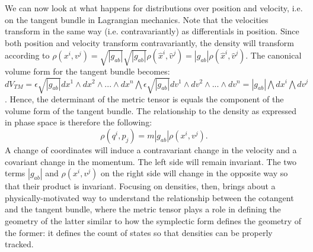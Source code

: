 \documentclass[letterpaper]{article}
\begin{document}

We can now look at what happens for distributions over position and velocity, i.e. on the tangent bundle in Lagrangian mechanics. Note that the velocities transform in the same way (i.e. contravariantly) as differentials in position. Since both position and velocity transform contravariantly, the density will transform according to $\rho(x^i, v^j) = \sqrt{|g_{ab}|} \sqrt{|g_{ab}|} \rho(\hat{x}^i, \hat{v}^j) = |g_{ab}| \rho(\hat{x}^i, \hat{v}^j)$. The canonical volume form for the tangent bundle becomes: $dV_{TM} = \epsilon \sqrt{|g_{ab}|} dx^1 \wedge dx^2 \wedge ... \wedge dx^n \bigwedge \epsilon \sqrt{|g_{ab}|} dv^1 \wedge dv^2 \wedge ... \wedge dv^n = |g_{ab}| \bigwedge dx^i \bigwedge dv^j$. Hence, the determinant of the metric tensor is equals the component of the volume form of the tangent bundle. The relationship to the density as expressed in phase space is therefore the following:
\begin{equation}
	\rho(q^i, p_j) = m |g_{ab}| \rho(x^i, v^j).
\end{equation}
A change of coordinates will induce a contravariant change in the velocity and a covariant change in the momentum. The left side will remain invariant. The two terms $|g_{ab}|$ and  $\rho(x^i, v^j)$ on the right side will change in the opposite way so that their product is invariant. Focusing on densities, then, brings about a physically-motivated way to understand the relationship between the cotangent and the tangent bundle, where the metric tensor plays a role in defining the geometry of the latter similar to how the symplectic form defines the geometry of the former: it defines the count of states so that densities can be properly tracked.
\end{document}
